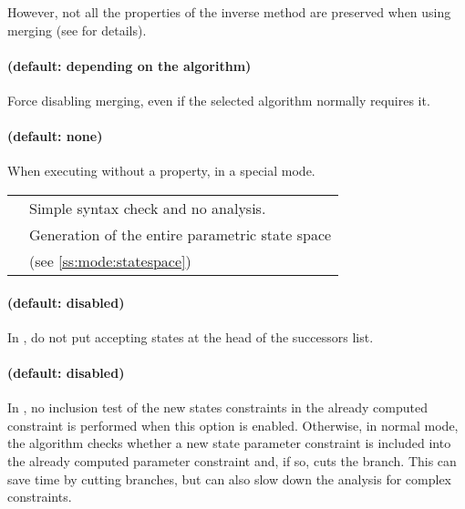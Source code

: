 However, not all the properties of the inverse method are preserved when using merging (see \cite{AFS13atva} for details).

\paragraph{ (default: depending on the algorithm)}
Force disabling merging, even if the selected algorithm normally requires it.


\paragraph{ (default: none)}
When executing \imitator{} without a property, \ie{} in a special mode.

\begin{longtable}{@{} l @{\ \ } p{12cm}}
	\styleOption{checksyntax} & Simple syntax check and no analysis.
	\\

	\styleOption{statespace}  & Generation of the entire parametric state space \\
	                          & (see \cref{ss:mode:statespace})                 \\
\end{longtable}

\paragraph{ (default: disabled)}
In , do not put accepting states at the head of the successors list.


\paragraph{ (default: disabled)}
In \EFsynth{}, no inclusion test of the new states constraints in the already computed constraint is performed when this option is enabled.
Otherwise, in normal mode, the algorithm checks whether a new state parameter constraint is included into the already computed parameter constraint and, if so, cuts the branch.
This can save time by cutting branches, but can also slow down the analysis for complex constraints.

